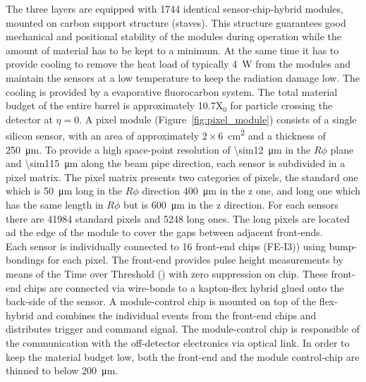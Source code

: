 The three layers are equipped with 1744 identical sensor-chip-hybrid modules, mounted on carbon support structure (staves). This structure guarantees good mechanical and positional stability of the modules during operation while the amount of material has to be kept to a minimum. At the same time it has to provide cooling to remove the heat load of typically \SI{4}{\watt} from the modules and maintain the sensors at a low temperature to keep the radiation damage low. The cooling is provided by a evaporative fluorocarbon system\cite{pixel_cooling}. The total material budget of the entire barrel is approximately 10.7\percent X$_0$ for particle crossing the detector at $\eta = 0$.
A pixel module (Figure~\ref{fig:pixel_module}) consists of a single silicon sensor, with an area of approximately $2\times6$\SI{}{\centi\meter^2} and a thickness of \SI{250}{\micro\meter}. To provide a high space-point resolution of  \SI{\sim12}{\micro\meter} in the $R\phi$ plane and \SI{\sim115}{\micro\meter} along the beam pipe direction, each sensor is subdivided in a pixel matrix. The pixel matrix presents two categories of pixels, the standard one which is \SI{50}{\micro\meter} long in the $R\phi$ direction \SI{400}{\micro\meter} in the z one, and long one which has the same length in $R\phi$ but is \SI{600}{\micro\meter} in the z direction. For each sensors there are 41984 standard pixels and 5248 long ones. The long pixels are located ad the edge of the module to cover the gaps between adjacent front-ends.\\
Each sensor is individually connected to 16 front-end chips (FE-I3)\cite{ale_vertex_3}) using bump-bondings for each pixel. The front-end provides pulse height measurements by means of the Time over Threshold (\tot) with zero suppression on chip. These front-end chips are connected via wire-bonds to a kapton-flex hybrid glued onto the back-side of the sensor. A module-control chip is mounted on top of the flex-hybrid and combines the individual events from the front-end chips and distributes trigger and command signal. The module-control chip is responsible of the communication with the off-detector electronics via optical link. In order to keep the material budget low, both the front-end and the module control-chip are thinned to below \SI{200}{\micro\meter}.

